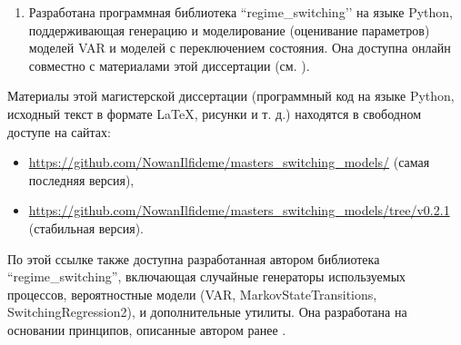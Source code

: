 \documentclass[a4paper,14pt]{extreport}
\newcommand{\coderepo}{https://github.com/NowanIlfideme/masters_switching_models}
\newcommand{\codeversion}{v0.2.1}
\newcommand{\genurl}[1]{\url{\coderepo/#1}}
\begin{document}
{\begin{enumerate}
	      \begin{enumerate}
		      \item При моделировании годовых темпов роста ВВП лучшей моделью оказалась $M.3$ \eqref{eq:ms_arx_m3}, регрессия с опережающим индикатором (годовые темпы роста ИЭН с лагом в 4 месяца).
		      \item Таким образом получено дополнительное подтверждение опережающего характера ИЭН и его пригодности к использованию в эконометрических моделях.
		      \item В рамках классического подхода для модели $M.3$ все коэффициенты оказались значимыми и моменты переключения (поворотные точки экономики) достаточно близки к аналогичным моментам, оцененными другими методами.
		      \item В рамках байесовского подхода (вероятностного программирования) получена схожая модель со схожими моментами переключения, несмотря на проблемы с трейсами этой модели.
	      \end{enumerate}
	\item Разработана программная библиотека ``regime\_switching’’ на языке Python, поддерживающая генерацию и моделирование (оценивание параметров) моделей VAR и моделей с переключением состояния. Она доступна онлайн совместно с материалами этой диссертации (см. ).
\end{enumerate}


\printbibliography[title=Список использованных источников]


\appendix
{}

\label{appendix}

Материалы этой магистерской диссертации (программный код на языке Python, исходный текст в формате \LaTeX, рисунки и т. д.) находятся в свободном доступе на сайтах:

\begin{itemize}
	\item \genurl{} (самая последняя версия),
	\item \genurl{tree/\codeversion} (стабильная версия).
\end{itemize}

По этой ссылке также доступна разработанная автором библиотека ``regime\_switching'', включающая случайные генераторы используемых процессов, вероятностные модели (VAR, MarkovStateTransitions, SwitchingRegression2), и дополнительные утилиты. Она разработана на основании принципов, описанные автором ранее \cite{mak_auto_tsa}.

}
\end{document}

